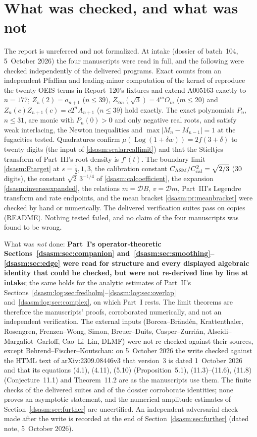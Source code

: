 \documentclass[11pt,letterpaper]{article}
\theoremstyle{remark}\newtheorem{remark}[theorem]{Remark}
\DeclareMathOperator{\Log}{Log}\DeclareMathOperator{\Var}{Var}
\begin{document}
\section*{What was checked, and what was not}\label{dsasm:sec:trust}
The report is unrefereed and not formalized. At intake (dossier of batch~104, 5~October 2026) the four manuscripts were read in full, and the following were checked independently of the delivered programs. Exact counts from an independent Pfaffian and leading-minor computation of the kernel of \cite[(4.1)]{bfk} reproduce the twenty OEIS terms in Report~120's fixtures and extend A005163 exactly to $n=177$; $Z_n(2)=a_{n+1}$ ($n\le39$), $Z_{2m}(\sqrt3)=4^mO_m$ ($m\le20$) and $Z_n(c)Z_{n+1}(c)=c2^nA_{n+1}$ ($n\le39$) hold exactly. The exact polynomials $P_n$, $n\le31$, are monic with $P_n(0)>0$ and only negative real roots, and satisfy weak interlacing, the Newton inequalities and $\max|M_n-M_{n-1}|=1$ at the fugacities tested. Quadratures confirm $\mu(\Log(1+\delta w))=2f(3+\delta)$ to twenty digits (the input of \eqref{dsasm:scalarreallimit}) and that the Stieltjes transform of Part~III's root density is $f'(t)$. The boundary limit \eqref{dsasm:Ftarget} at $s=\frac12,1,3$, the calibration constant $C_{\rm ASM}/C_{\rm cal}^2=\sqrt{2/3}$ (30 digits), the constant $\sqrt2\,3^{-1/4}$ of \eqref{dsasm:calcoefficient}, the expansion \eqref{dsasm:inverseexpanded}, the relations $m=\mathcal DB$, $v=\mathcal Dm$, Part~III's Legendre transform and rate endpoints, and the mean bracket \eqref{dsasm:pr:meanbracket} were checked by hand or numerically. The delivered verification suites pass on copies (README). Nothing tested failed, and no claim of the four manuscripts was found to be wrong.

What was \emph{not} done: \textbf{Part~I's operator-theoretic Sections~\ref{dsasm:sec:companion} and~\ref{dsasm:sec:smoothing}--\ref{dsasm:sec:edge} were read for structure and every displayed algebraic identity that could be checked, but were not re-derived line by line at intake}; the same holds for the analytic estimates of Part~II's Sections~\ref{dsasm:log:sec:fredholm}--\ref{dsasm:log:sec:overlap} and~\ref{dsasm:log:sec:complex}, on which Part~I rests. The limit theorems are therefore the manuscripts' proofs, corroborated numerically, and not an independent verification. The external inputs (Borcea--Br\"and\'en, Krattenthaler, Rosengren, Frenzen--Wong, Simon, Breuer--Duits, Casper--Zurri\'an, Alseidi--Margaliot--Garloff, Cao--Li--Lin, DLMF) were not re-checked against their sources, except Behrend--Fischer--Koutschan: on 5~October 2026 the write checked against the HTML text of arXiv:2309.08446v3 that version~3 is dated 1~October 2026 and that its equations (4.1), (4.11), (5.10) (Proposition~5.1), (11.3)--(11.6), (11.8) (Conjecture~11.1) and Theorem~11.2 are as the manuscripts use them. The finite checks of the delivered suites and of the dossier corroborate identities; none proves an asymptotic statement, and the numerical amplitude estimates of Section~\ref{dsasm:sec:further} are uncertified. An independent adversarial check made after the write is recorded at the end of Section~\ref{dsasm:sec:further} (dated note, 5~October 2026).
\end{document}
